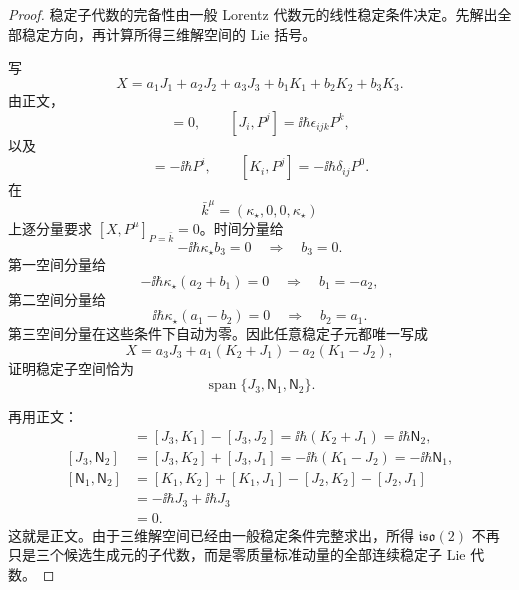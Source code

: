 \begin{proof}
稳定子代数的完备性由一般 Lorentz 代数元的线性稳定条件决定。先解出全部稳定方向，再计算所得三维解空间的 Lie 括号。

写
\begin{equation*}
 X=a_1J_1+a_2J_2+a_3J_3
 +b_1K_1+b_2K_2+b_3K_3.
\end{equation*}
由正文，
\begin{equation*}
 [J_i,P^0]=0,
 \qquad
 [J_i,P^j]=\ii\hbar\epsilon_{ijk}P^k,
\end{equation*}
以及
\begin{equation*}
 [K_i,P^0]=-\ii\hbar P^i,
 \qquad
 [K_i,P^j]=-\ii\hbar\delta_{ij}P^0.
\end{equation*}
在
\begin{equation*}
 \bar k^\mu=(\kappa_\star,0,0,\kappa_\star)
\end{equation*}
上逐分量要求 $[X,P^\mu]_{P=\bar k}=0$。时间分量给
\begin{equation*}
 -\ii\hbar\kappa_\star b_3=0
 \quad\Longrightarrow\quad b_3=0.
\end{equation*}
第一空间分量给
\begin{equation*}
 -\ii\hbar\kappa_\star(a_2+b_1)=0
 \quad\Longrightarrow\quad b_1=-a_2,
\end{equation*}
第二空间分量给
\begin{equation*}
 \ii\hbar\kappa_\star(a_1-b_2)=0
 \quad\Longrightarrow\quad b_2=a_1.
\end{equation*}
第三空间分量在这些条件下自动为零。因此任意稳定子元都唯一写成
\begin{equation*}
 X=a_3J_3+a_1(K_2+J_1)-a_2(K_1-J_2),
\end{equation*}
证明稳定子空间恰为
\begin{equation*}
 \operatorname{span}\{J_3,\mathsf N_1,\mathsf N_2\}.
\end{equation*}

再用正文：
\begin{align*}
 [J_3,\mathsf N_1]
 &=[J_3,K_1]-[J_3,J_2]
 =\ii\hbar(K_2+J_1)
 =\ii\hbar\mathsf N_2,\\
 [J_3,\mathsf N_2]
 &=[J_3,K_2]+[J_3,J_1]
 =-\ii\hbar(K_1-J_2)
 =-\ii\hbar\mathsf N_1,\\
 [\mathsf N_1,\mathsf N_2]
 &=[K_1,K_2]+[K_1,J_1]-[J_2,K_2]-[J_2,J_1]\\
 &=-\ii\hbar J_3+\ii\hbar J_3\\
 &=0.
\end{align*}
这就是正文。由于三维解空间已经由一般稳定条件完整求出，所得 $\mathfrak{iso}(2)$ 不再只是三个候选生成元的子代数，而是零质量标准动量的全部连续稳定子 Lie 代数。
\end{proof}

